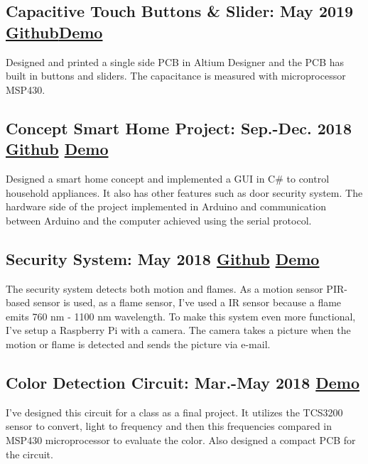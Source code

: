 \documentclass[10pt]{article}
\begin{document}
\subsection{Capacitive Touch Buttons \& Slider: May 2019  
\textcolor{Mycolor3}{\href{https://github.com/Zrrck/Capacitive-Touch-Implementation-}{\small{Github}}}\textcolor{Mycolor2}{\href{https://youtu.be/4U37eLWOmPw} {\small{Demo}}}} 
Designed and printed a single side PCB in Altium Designer and 
the PCB has built in buttons and sliders. The capacitance is measured with microprocessor MSP430.

\subsection{Concept Smart Home Project: Sep.-Dec. 2018 \textcolor{Mycolor3}{\href{https://github.com/Zrrck/Like-a-Smart-Home-but-Not}{\small{Github}}}
\textcolor{Mycolor2}{\href{https://youtu.be/kD4CY6Yt-gg}{\small{Demo}}}}
Designed a smart home concept and implemented a GUI in C\# to control household appliances. It also has other features such as door security system. The hardware side of the project implemented in Arduino and communication between Arduino and the computer achieved using the serial protocol.


\subsection{Security System: May 2018 \textcolor{Mycolor3}{\href{https://github.com/Zrrck/Raspberry-Pi-Fire-Security-System}{\small{Github}}}
\textcolor{Mycolor2}{\href{https://youtu.be/s6VeqZgOBLw}{\small{Demo}}}}
The security system detects both motion and flames. As a motion sensor PIR-based sensor is used, 
as a flame sensor, I've used a IR sensor because a flame emits 760 nm - 1100 nm wavelength. To make this system even more functional, I've setup a Raspberry Pi with a camera. The camera takes a picture when the motion or flame is detected and sends the picture via e-mail.  

\subsection{Color Detection Circuit: Mar.-May 2018 \textcolor{Mycolor3}{\href{https://github.com/Zrrck/Color-Detection-using-TCS3200}{}}
\textcolor{Mycolor2}{\href{https://youtu.be/NfwZGEqTPVs}{\small{Demo}}}}
I've designed this circuit for a class as a final project. It utilizes the TCS3200 sensor to convert, light to frequency and then this frequencies compared in MSP430 microprocessor to evaluate the color. Also designed a compact PCB for the circuit.
\end{document}
